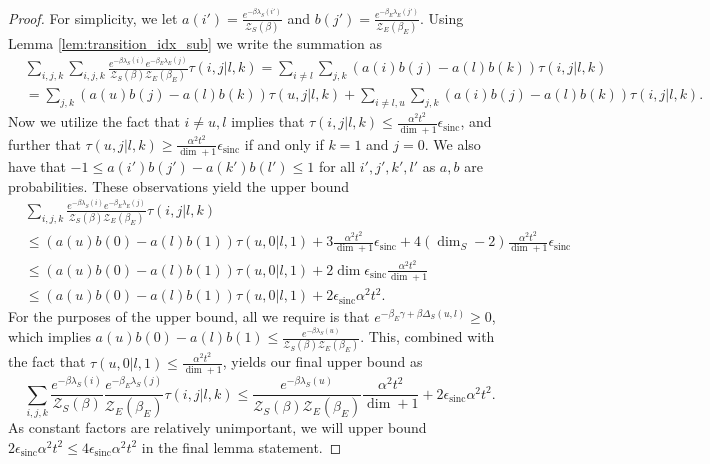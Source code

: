 \documentclass{article}
\newcommand{\partfun}{\mathcal{Z}}
\DeclareMathOperator{\sinc}{sinc}
\begin{document}
\begin{proof}
    For simplicity, we let $a(i') = \frac{e^{-\beta \lambda_S(i')}}{\partfun_S(\beta)}$ and $b(j') = \frac{e^{-\beta_E \lambda_E(j')}}{\partfun_E(\beta_E)}$. Using Lemma \ref{lem:transition_idx_sub} we write the summation as
    \begin{align}
        &\sum_{i,j,k} \sum_{i, j, k} \frac{e^{-\beta \lambda_S(i)} e^{-\beta_E \lambda_E(j)}}{\partfun_S(\beta) \partfun_E(\beta_E)} \tau(i,j|l,k) = \sum_{i \neq l} \sum_{j,k} (a(i) b(j) - a(l) b(k)) \tau(i,j|l,k) \\
        &= \sum_{j,k} (a(u) b(j) - a(l) b(k)) \tau(u,j | l,k) + \sum_{i \neq l,u} \sum_{j,k} (a(i) b(j) - a(l) b(k)) \tau(i,j| l,k).
    \end{align}
    Now we utilize the fact that $i \neq u,l$ implies that $\tau(i,j|l,k) \leq \frac{\alpha^2 t^2}{\dim + 1} \epsilon_{\sinc}$, and further that $\tau(u,j|l,k) \geq \frac{\alpha^2 t^2}{\dim + 1}\epsilon_{\sinc}$ if and only if $k = 1$ and $j = 0$. We also have that $-1 \leq a(i') b(j') - a(k') b(l') \leq 1$ for all $i', j', k', l'$ as $a,b$ are probabilities. These observations yield the upper bound
    \begin{align}
        &\sum_{i, j, k} \frac{e^{-\beta \lambda_S(i)} e^{-\beta_E \lambda_E(j)}}{\partfun_S(\beta) \partfun_E(\beta_E)} \tau(i,j|l,k) \nonumber \\
        &\leq (a(u) b(0) - a(l) b(1)) \tau(u,0|l,1) + 3 \frac{\alpha^2 t^2}{\dim + 1} \epsilon_{\sinc} + 4 (\dim_S - 2) \frac{\alpha^2 t^2}{\dim + 1} \epsilon_{\sinc} \\
        &\leq (a(u) b(0) - a(l) b(1)) \tau(u,0|l,1) + 2 \dim \epsilon_{\sinc} \frac{\alpha^2 t^2}{\dim + 1} \\
        &\leq (a(u) b(0) - a(l) b(1)) \tau(u,0|l,1) + 2 \epsilon_{\sinc} \alpha^2 t^2.
    \end{align}
    For the purposes of the upper bound, all we require is that $e^{-\beta_E \gamma + \beta \Delta_S(u,l)} \geq 0$, which implies $a(u) b(0) - a(l) b(1) \leq \frac{e^{-\beta \lambda_S(u)}}{\partfun_S(\beta) \partfun_E(\beta_E)}$. This, combined with the fact that $\tau(u,0|l,1) \leq \frac{\alpha^2 t^2}{\dim + 1}$, yields our final upper bound as
    \begin{equation}
        \sum_{i,j,k} \frac{e^{-\beta \lambda_S(i)}}{\partfun_S(\beta)} \frac{e^{-\beta_E \lambda_S(j)}}{\partfun_E(\beta_E)} \tau(i,j|l,k) \leq \frac{e^{-\beta \lambda_S(u)}}{\partfun_S(\beta) \partfun_E(\beta_E)} \frac{\alpha^2 t^2}{\dim + 1} + 2 \epsilon_{\sinc} \alpha^2 t^2. \label{eq:transition_prob_upper_bound_final}
    \end{equation}
    As constant factors are relatively unimportant, we will upper bound $2 \epsilon_{\sinc} \alpha^2 t^2 \leq 4 \epsilon_{\sinc} \alpha^2 t^2$ in the final lemma statement.


\end{proof}
\end{document}
